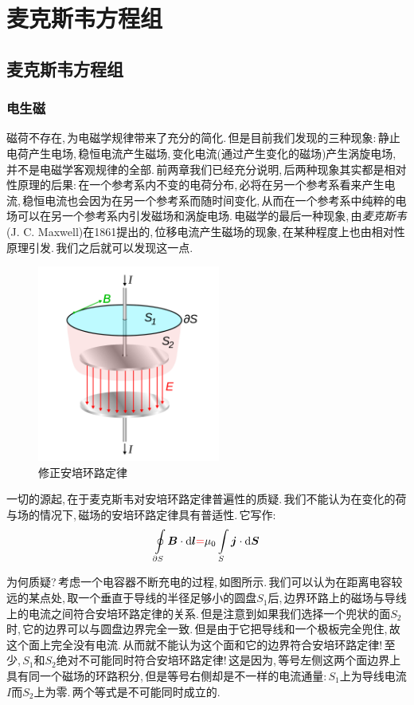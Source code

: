 \chapter{麦克斯韦方程组}


\section{麦克斯韦方程组}

\subsection{电生磁}

磁荷不存在,\,为电磁学规律带来了充分的简化.\,但是目前我们发现的三种现象:\,静止电荷产生电场,\,稳恒电流产生磁场,\,变化电流(通过产生变化的磁场)产生涡旋电场,\,并不是电磁学客观规律的全部.\,前两章我们已经充分说明,\,后两种现象其实都是相对性原理的后果:\,在一个参考系内不变的电荷分布,\,必将在另一个参考系看来产生电流,\,稳恒电流也会因为在另一个参考系而随时间变化,\,从而在一个参考系中纯粹的电场可以在另一个参考系内引发磁场和涡旋电场.\,电磁学的最后一种现象,\,由\emph{麦克斯韦}(J. C. Maxwell)在1861提出的,\,位移电流产生磁场的现象,\,在某种程度上也由相对性原理引发.\,我们之后就可以发现这一点.

\begin{figure}
\vspace{-0.1cm}
\centering
\includegraphics[width=6cm]{image/7-6-1.png}
\caption{修正安培环路定律}
\end{figure}
一切的源起,\,在于麦克斯韦对安培环路定律普遍性的质疑.\,我们不能认为在变化的荷与场的情况下,\,磁场的安培环路定律具有普适性.\,它写作:
\[\oint\limits_{\partial S} \boldsymbol{B}\cdot \textrm{d} \boldsymbol{l}{\color{red}{=}}\mu_0\int\limits_{S}\boldsymbol{j}\cdot \textrm{d} \boldsymbol{S}\]

为何质疑?\,考虑一个电容器不断充电的过程,\,如图所示.\,我们可以认为在距离电容较远的某点处,\,取一个垂直于导线的半径足够小的圆盘$S_1$后,\,边界环路上的磁场与导线上的电流之间符合安培环路定律的关系.\,但是注意到如果我们选择一个兜状的面$S_2$时,\,它的边界可以与圆盘边界完全一致.\,但是由于它把导线和一个极板完全兜住,\,故这个面上完全没有电流.\,从而就不能认为这个面和它的边界符合安培环路定律!\,至少,\,$S_1$和$S_2$绝对不可能同时符合安培环路定律!\,这是因为,\,等号左侧这两个面边界上具有同一个磁场的环路积分,\,但是等号右侧却是不一样的电流通量:\,$S_1$上为导线电流$I$而$S_2$上为零.\,两个等式是不可能同时成立的.

